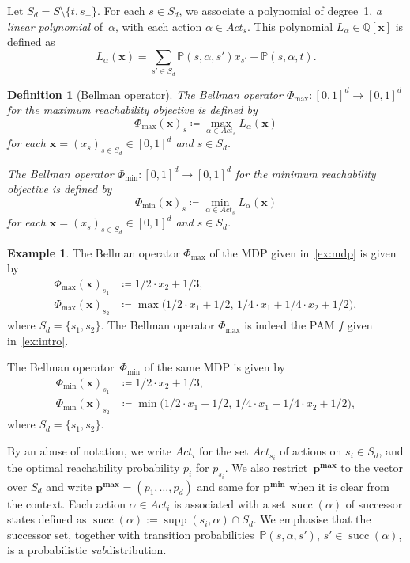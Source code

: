 \documentclass[preprint,12pt]{elsarticle}
\theoremstyle{plain}
\newtheorem{definition}[theorem]{Definition}
\theoremstyle{definition}
\newtheorem{example}[theorem]{Example}
\theoremstyle{remark}
\theoremstyle{claimstyle}
\newcommand{\prob}{\mathbb{P}}
\newcommand{\QQ}{\mathbb{Q}}
\DeclareMathOperator*{\supp}{supp}
\DeclareMathOperator*{\suc}{succ}
\begin{document}
Let $S_d = S \setminus \{t, s_{-}\}$. 
For each $s\in S_d$, we associate a polynomial of degree~1, \emph{a linear polynomial} of~$\alpha$, with each action $\alpha \in Act_s$. This polynomial $L_\alpha \in \QQ[\bm{x}]$ is defined as 
\[L_\alpha(\bm{x}) = \sum_{s' \in S_d} \prob(s, \alpha, s') x_{s'}  + \prob(s, \alpha, t).\]%
\begin{definition}[Bellman operator]
	The \emph{Bellman operator} $\Phi_{\max} \colon [0, 1]^d\rightarrow [0, 1]^d$ \emph{for the maximum reachability objective} is defined by \[\Phi_{\max}(\bm{x})_s \coloneqq \max_{\alpha\in Act_s} L_\alpha(\bm{x})\]
	for each $\bm{x} = (x_s)_{s \in S_d}\in [0, 1]^d$ and $s\in S_d$.

	The \emph{Bellman operator} $\Phi_{\min} \colon [0, 1]^d\rightarrow [0, 1]^d$ \emph{for the minimum reachability objective} is defined by \[\Phi_{\min}(\bm{x})_s \coloneqq \min_{\alpha\in Act_s} L_\alpha(\bm{x})\]
	for each $\bm{x} = (x_s)_{s \in S_d}\in [0, 1]^d$ and $s\in S_d$.
\end{definition}
\begin{example}
	The Bellman operator $\Phi_{\max}$ of the MDP given in~\cref{ex:mdp} is given by 
	\begin{align*}
		\Phi_{\max}(\bm{x})_{s_1} &\coloneqq 1/2\cdot x_2 + 1/3, \\
		\Phi_{\max}(\bm{x})_{s_2} &\coloneqq \max\big(1/2 \cdot x_1 + 1/2,\, 1/4\cdot x_1 + 1/4\cdot x_2 + 1/2 \big),
	\end{align*}
	where $S_d =\{s_1, s_2\}$. The Bellman operator $\Phi_{\max}$ is indeed the PAM $f$ given in~\cref{ex:intro}. 
	
	The Bellman operator~$\Phi_{\min}$ of the same MDP is given by
	\begin{align*}
		\Phi_{\min}(\bm{x})_{s_1} &\coloneqq 1/2\cdot x_2 + 1/3, \\
		\Phi_{\min}(\bm{x})_{s_2} &\coloneqq \min\big(1/2 \cdot x_1 + 1/2,\, 1/4\cdot x_1 + 1/4\cdot x_2 + 1/2 \big),
	\end{align*}
	where $S_d =\{s_1, s_2\}$.
\end{example}






By an abuse of notation, we write $Act_i$ for the set $Act_{s_i}$ of actions on $s_i\in S_d$, and the optimal reachability probability $p_i$ for $p_{s_i}$. 
We also restrict~$\bm{p^{\max}}$ to the vector over $S_d$ and write $\bm{p^{\max}} = (p_1, \dots, p_d)$ and same for $\bm{p^{\min}}$ when it is clear from the context.
Each action $\alpha \in Act_i$ is associated with a set $\suc(\alpha)$ of successor states defined as $\suc(\alpha):= \supp(s_i, \alpha) \cap S_d$. We emphasise that the successor set, together with transition probabilities~$\prob(s, \alpha, s')$, $s' \in \suc(\alpha)$, is a probabilistic \emph{sub}distribution.
\end{document}
